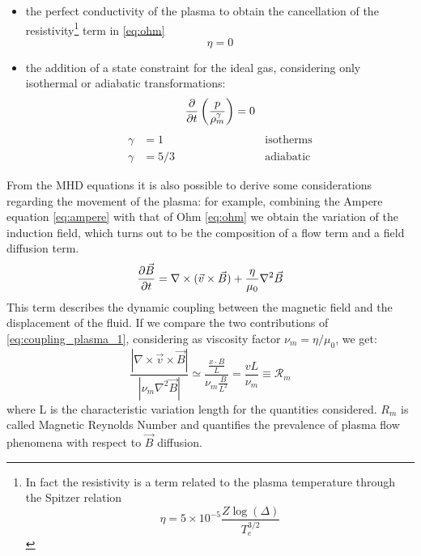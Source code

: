 \begin{itemize}
    \item the perfect conductivity of the plasma to obtain the cancellation of the resistivity\footnote{In fact the resistivity is a term related to the plasma temperature through the Spitzer relation \begin{equation}
        \eta = 5 \times 10^{-5} \frac{Z \log(\Delta)}{T_e^{3/2}}
    \end{equation}} term in \eqref{eq:ohm}
    \begin{equation}
        \eta = 0
    \end{equation}
    \item the addition of a state constraint for the ideal gas, considering only isothermal or adiabatic transformations:
    \begin{equation}
        \pdv{}{t}\left( \frac{p}{\rho_m^\gamma} \right) = 0
    \end{equation}
    \begin{align}
        \gamma &= 1    \hspace{3cm} & \text{isotherms} \\
        \gamma &= 5/3  \hspace{3cm} & \text{adiabatic}
    \end{align}
\end{itemize}
From the MHD equations it is also possible to derive some considerations regarding the movement of the plasma: for example, combining the Ampere equation \ref{eq:ampere} with that of Ohm \ref{eq:ohm} we obtain the variation of the induction field, which turns out to be the composition of a flow term and a field diffusion term.
\begin{equation}
    \pdv{\Vec{B}}{t} = \nabla \times ( \Vec{v} \times \Vec{B} ) + \frac{\eta}{\mu_0} \nabla^2 \Vec{B}
    \label{eq:coupling_plasma_1}
\end{equation}
This term describes the dynamic coupling between the magnetic field and the displacement of the fluid. If we compare the two contributions of \eqref{eq:coupling_plasma_1}, considering as viscosity factor $\nu_m = \eta/\mu_0$, we get:
\begin{equation}
    \frac{|\nabla \times \Vec{v} \times \Vec{B}|}{|\nu_m \nabla^2 \Vec{B}|} \simeq \frac{\frac{x \cdot B}{L}}{\nu_m\frac{B}{L^2}} = \frac{vL}{\nu_m} \equiv \mathcal{R}_m
\end{equation}
where L is the characteristic variation length for the quantities considered. $R_m$ is called Magnetic Reynolds Number and quantifies the prevalence of plasma flow phenomena with respect to $\Vec{B}$ diffusion.


